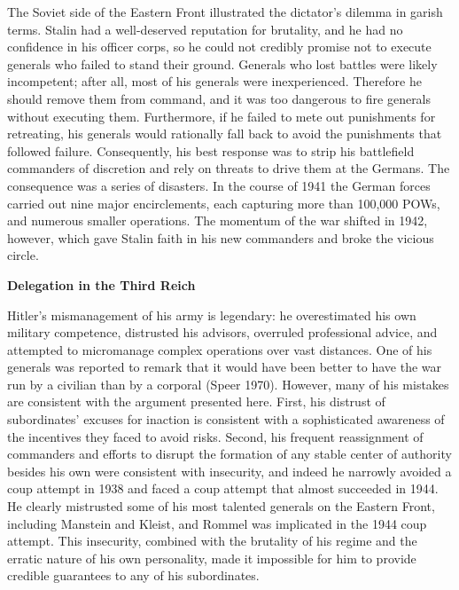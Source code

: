 \documentclass[11pt,]{article}
\begin{document}
The Soviet side of the Eastern Front illustrated the dictator's dilemma in garish terms.  Stalin had a well-deserved reputation for brutality, and he had no confidence in his officer corps, so he could not credibly promise not to execute generals who failed to stand their ground.  Generals who lost battles were likely incompetent; after all, most of his generals were inexperienced.  Therefore he should remove them from command, and it was too dangerous to fire generals without executing them.  Furthermore, if he failed to mete out punishments for retreating, his generals would rationally fall back to avoid the punishments that followed failure.  Consequently, his best response was to strip his battlefield commanders of discretion and rely on threats to drive them at the Germans.  The consequence was a series of disasters.  In the course of 1941 the German forces carried out nine major encirclements, each capturing more than 100,000 POWs, and numerous smaller operations.  The momentum of the war shifted in 1942, however, which gave Stalin faith in his new commanders and broke the vicious circle.

\begin{center}
\textbf{\Large{Delegation in the Third Reich}}\normalsize\\
\end{center}
Hitler's mismanagement of his army is legendary:  he overestimated his own military competence, distrusted his advisors, overruled professional advice, and attempted to micromanage complex operations over vast distances.  One of his generals was reported to remark that it would have been better to have the war run by a civilian than by a corporal (Speer 1970).  However, many of his mistakes are consistent with the argument presented here.  First, his distrust of subordinates' excuses for inaction is consistent with a sophisticated awareness of the incentives they faced to avoid risks.  Second, his frequent reassignment of commanders and efforts to disrupt the formation of any stable center of authority besides his own were consistent with insecurity, and indeed he narrowly avoided a coup attempt in 1938 and faced a coup attempt that almost succeeded in 1944.  He clearly mistrusted some of his most talented generals on the Eastern Front, including Manstein and Kleist, and Rommel was implicated in the 1944 coup attempt.  This insecurity, combined with the brutality of his regime and the erratic nature of his own personality, made it impossible for him to provide credible guarantees to any of his subordinates.  
\end{document}
